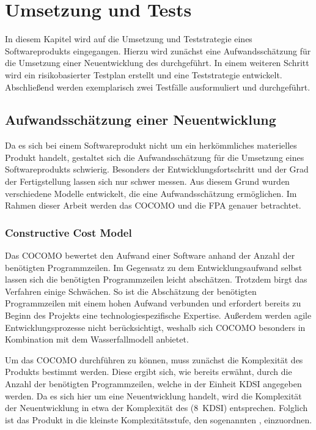 \section{Umsetzung und Tests}
In diesem Kapitel wird auf die Umsetzung und Teststrategie eines Softwareprodukts eingegangen.
Hierzu wird zunächst eine Aufwandsschätzung für die Umsetzung einer Neuentwicklung des  durchgeführt.
In einem weiteren Schritt wird ein risikobasierter Testplan erstellt und eine Teststrategie entwickelt.
Abschließend werden exemplarisch zwei Testfälle ausformuliert und durchgeführt.

\subsection{Aufwandsschätzung einer Neuentwicklung}
Da es sich bei einem Softwareprodukt nicht um ein herkömmliches materielles Produkt handelt, gestaltet sich die Aufwandsschätzung für die Umsetzung eines Softwareprodukts schwierig.
Besonders der Entwicklungsfortschritt und der Grad der Fertigstellung lassen sich nur schwer messen.
Aus diesem Grund wurden verschiedene Modelle entwickelt, die eine Aufwandsschätzung ermöglichen.
Im Rahmen dieser Arbeit werden das \ac{COCOMO} und die \ac{FPA} genauer betrachtet.

\subsubsection{Constructive Cost Model}
Das \ac{COCOMO} bewertet den Aufwand einer Software anhand der Anzahl der benötigten Programmzeilen.
Im Gegensatz zu dem Entwicklungsaufwand selbst lassen sich die benötigten Programmzeilen leicht abschätzen.
Trotzdem birgt das Verfahren einige Schwächen.
So ist die Abschätzung der benötigten Programmzeilen mit einem hohen Aufwand verbunden und erfordert bereits zu Beginn des Projekts eine technologiespezifische Expertise.
Außerdem werden agile Entwicklungsprozesse nicht berücksichtigt, weshalb sich \ac{COCOMO} besonders in Kombination mit dem Wasserfallmodell anbietet.

\noindent{}Um das \ac{COCOMO} durchführen zu können, muss zunächst die Komplexität des Produkts bestimmt werden.
Diese ergibt sich, wie bereits erwähnt, durch die Anzahl der benötigten Programmzeilen, welche in der Einheit \ac{KDSI} angegeben werden.
Da es sich hier um eine Neuentwicklung handelt, wird die Komplexität der Neuentwicklung in etwa der Komplexität des  (8~\ac{KDSI}) entsprechen.
Folglich ist das Produkt in die kleinste Komplexitätsstufe, den sogenannten , einzuordnen.

